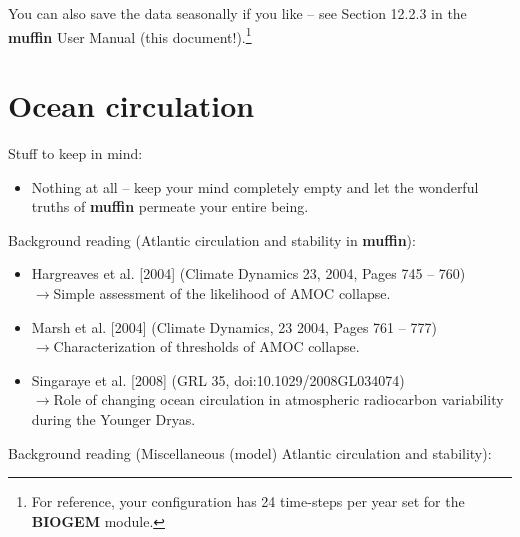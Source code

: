 \documentclass[11pt,fleqn]{book} %
\begin{document}
You can also save the data seasonally if you like – see Section 12.2.3 in the \textbf{muffin} User Manual (this document!).\footnote{For reference, your configuration has 24 time-steps per year set for the \textbf{BIOGEM} module.}


\cleardoublepage


\chapter{Ocean circulation}

\hfill \break

\noindent Stuff to keep in mind:

\begin{itemize}
\item Nothing at all – keep your mind completely empty and let the wonderful truths of \textbf{muffin} permeate your entire being.
\end{itemize}

\vspace{2mm}
\noindent Background reading (Atlantic circulation and stability in \textbf{muffin}):

\vspace{2mm}
\begin{itemize}
\item Hargreaves et al. [2004] (Climate Dynamics 23, 2004, Pages 745 – 760)
\\\(\rightarrow\)Simple assessment of the likelihood of AMOC collapse.
\item Marsh et al. [2004] (Climate Dynamics, 23 2004, Pages 761 – 777)
\\\(\rightarrow\)Characterization of thresholds of AMOC collapse.
\item Singaraye et al. [2008] (GRL 35, doi:10.1029/2008GL034074)
\\\(\rightarrow\)Role of changing ocean circulation in atmospheric radiocarbon variability during the Younger Dryas.
\end{itemize}

\vspace{2mm}
\noindent Background reading (Miscellaneous (model) Atlantic circulation and stability):
\end{document}
